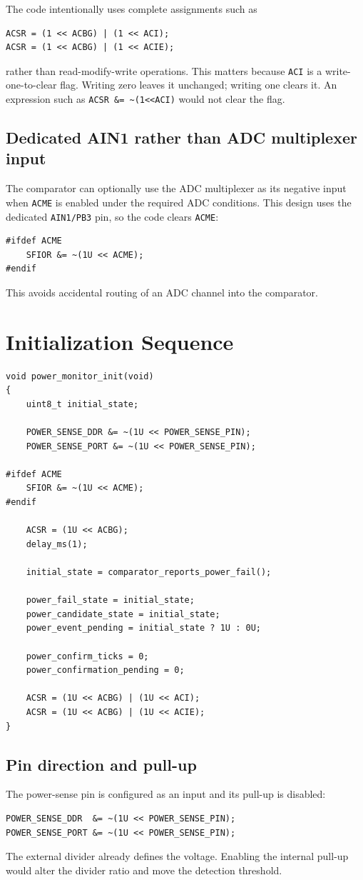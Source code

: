 \documentclass[11pt,a4paper]{article}
\begin{document}
The code intentionally uses complete assignments such as
\begin{lstlisting}[style=cstyle]
ACSR = (1 << ACBG) | (1 << ACI);
ACSR = (1 << ACBG) | (1 << ACIE);
\end{lstlisting}
rather than read-modify-write operations. This matters because \texttt{ACI} is a write-one-to-clear flag. Writing zero leaves it unchanged; writing one clears it. An expression such as \texttt{ACSR \&= \textasciitilde(1<<ACI)} would not clear the flag.

\subsection{Dedicated AIN1 rather than ADC multiplexer input}
The comparator can optionally use the ADC multiplexer as its negative input when \texttt{ACME} is enabled under the required ADC conditions. This design uses the dedicated \texttt{AIN1/PB3} pin, so the code clears \texttt{ACME}:
\begin{lstlisting}[style=cstyle]
#ifdef ACME
    SFIOR &= ~(1U << ACME);
#endif
\end{lstlisting}
This avoids accidental routing of an ADC channel into the comparator.

\section{Initialization Sequence}

\begin{lstlisting}[style=cstyle,caption={Power-monitor initialization.}]
void power_monitor_init(void)
{
    uint8_t initial_state;

    POWER_SENSE_DDR &= ~(1U << POWER_SENSE_PIN);
    POWER_SENSE_PORT &= ~(1U << POWER_SENSE_PIN);

#ifdef ACME
    SFIOR &= ~(1U << ACME);
#endif

    ACSR = (1U << ACBG);
    delay_ms(1);

    initial_state = comparator_reports_power_fail();

    power_fail_state = initial_state;
    power_candidate_state = initial_state;
    power_event_pending = initial_state ? 1U : 0U;

    power_confirm_ticks = 0;
    power_confirmation_pending = 0;

    ACSR = (1U << ACBG) | (1U << ACI);
    ACSR = (1U << ACBG) | (1U << ACIE);
}
\end{lstlisting}

\subsection{Pin direction and pull-up}
The power-sense pin is configured as an input and its pull-up is disabled:
\begin{lstlisting}[style=cstyle]
POWER_SENSE_DDR  &= ~(1U << POWER_SENSE_PIN);
POWER_SENSE_PORT &= ~(1U << POWER_SENSE_PIN);
\end{lstlisting}
The external divider already defines the voltage. Enabling the internal pull-up would alter the divider ratio and move the detection threshold.
\end{document}
